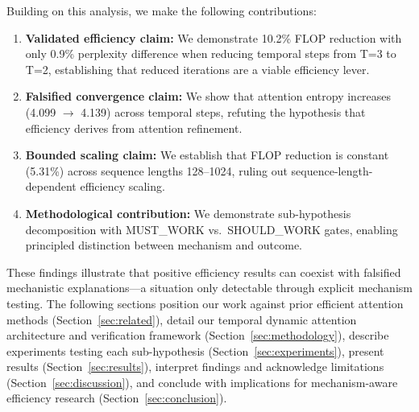 Building on this analysis, we make the following contributions:

\begin{enumerate}
    \item \textbf{Validated efficiency claim:} We demonstrate 10.2\% FLOP reduction with only 0.9\% perplexity difference when reducing temporal steps from T=3 to T=2, establishing that reduced iterations are a viable efficiency lever.

    \item \textbf{Falsified convergence claim:} We show that attention entropy increases (4.099 $\rightarrow$ 4.139) across temporal steps, refuting the hypothesis that efficiency derives from attention refinement.

    \item \textbf{Bounded scaling claim:} We establish that FLOP reduction is constant (5.31\%) across sequence lengths 128--1024, ruling out sequence-length-dependent efficiency scaling.

    \item \textbf{Methodological contribution:} We demonstrate sub-hypothesis decomposition with MUST\_WORK vs.\ SHOULD\_WORK gates, enabling principled distinction between mechanism and outcome.
\end{enumerate}

These findings illustrate that positive efficiency results can coexist with falsified mechanistic explanations---a situation only detectable through explicit mechanism testing. The following sections position our work against prior efficient attention methods (Section~\ref{sec:related}), detail our temporal dynamic attention architecture and verification framework (Section~\ref{sec:methodology}), describe experiments testing each sub-hypothesis (Section~\ref{sec:experiments}), present results (Section~\ref{sec:results}), interpret findings and acknowledge limitations (Section~\ref{sec:discussion}), and conclude with implications for mechanism-aware efficiency research (Section~\ref{sec:conclusion}).
